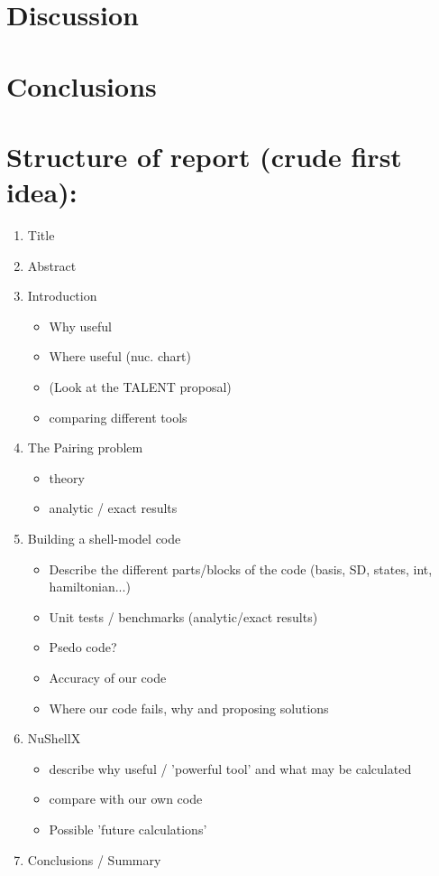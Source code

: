 \documentclass[twoside]{article}
\begin{document}

\section{Discussion}




\section{Conclusions}






\section*{Structure of report (crude first idea):}

\begin{enumerate}
\item Title
\item Abstract
\item Introduction
\begin{itemize}
\item Why useful
\item Where useful (nuc. chart)
\item (Look at the TALENT proposal)
\item comparing different tools
\end{itemize}
\item The Pairing problem
\begin{itemize}
\item theory
\item analytic / exact results
\end{itemize}
\item Building a shell-model code
\begin{itemize}
\item Describe the different parts/blocks of the code (basis, SD, states, int, hamiltonian...)
\item Unit tests / benchmarks (analytic/exact results)
\item Psedo code?
\item Accuracy of our code
\item Where our code fails, why and proposing solutions
\end{itemize}
\item NuShellX
\begin{itemize}
\item describe why useful / 'powerful tool' and what may be calculated
\item compare with our own code
\item Possible 'future calculations'
\end{itemize}
\item Conclusions / Summary
\end{enumerate}
\end{document}
